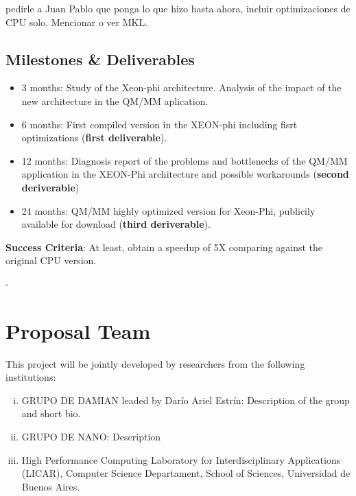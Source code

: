 \documentclass[a4paper,10pt]{article}
\begin{document}
pedirle a Juan Pablo que ponga lo que hizo hasta ahora, incluir optimizaciones de CPU solo.
Mencionar o ver MKL.

\subsection{Milestones \& Deliverables}
\begin{itemize}
\item 3 months: Study of the Xeon-phi architecture. Analysis of the impact of the new architecture in the QM/MM aplication.

\item 6 months: First compiled version in the XEON-phi including fisrt optimizations (\textbf{first deliverable}).

\item 12 months: Diagnosis report of the problems and bottlenecks of the QM/MM application in the XEON-Phi architecture and possible workarounds (\textbf{second deriverable})

\item 24 months: QM/MM highly optimized version for Xeon-Phi, publicily available for download (\textbf{third deriverable}).
\end{itemize}

\begin{framed}
\textbf{Success Criteria}: At least, obtain a speedup of 5X comparing against the original CPU version.
\end{framed}

-
\newpage

\section{Proposal Team}

This project will be jointly developed by researchers from the following institutions:
\begin{enumerate}[i)]
\item GRUPO DE DAMIAN leaded by Dar\'io Ariel Estr\'in: Description of the group and short bio.


\item GRUPO DE NANO: Description

\item High Performance Computing Laboratory for Interdisciplinary Applications (LICAR), Computer Science Departament, School of Sciences, Universidad de Buenos Aires.

\end{enumerate}
\end{document}

